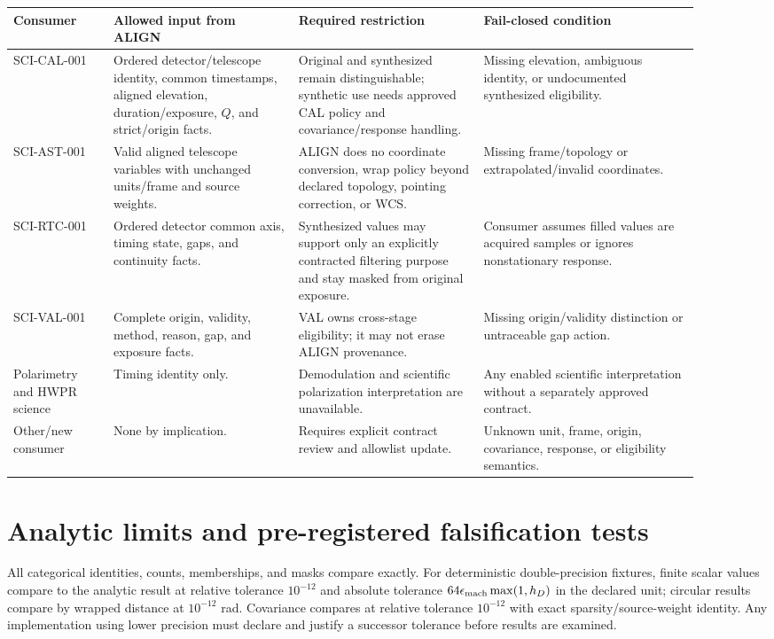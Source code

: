 \documentclass[11pt]{article}
\begin{document}
\begin{longtable}{L{0.13\linewidth}L{0.24\linewidth}L{0.24\linewidth}L{0.29\linewidth}}
\toprule
Consumer & Allowed input from ALIGN & Required restriction & Fail-closed condition\\
\midrule
SCI-CAL-001 & Ordered detector/telescope identity, common timestamps, aligned elevation, duration/exposure, \(Q\), and strict/origin facts. & Original and synthesized remain distinguishable; synthetic use needs approved CAL policy and covariance/response handling. & Missing elevation, ambiguous identity, or undocumented synthesized eligibility.\\
SCI-AST-001 & Valid aligned telescope variables with unchanged units/frame and source weights. & ALIGN does no coordinate conversion, wrap policy beyond declared topology, pointing correction, or WCS. & Missing frame/topology or extrapolated/invalid coordinates.\\
SCI-RTC-001 & Ordered detector common axis, timing state, gaps, and continuity facts. & Synthesized values may support only an explicitly contracted filtering purpose and stay masked from original exposure. & Consumer assumes filled values are acquired samples or ignores nonstationary response.\\
SCI-VAL-001 & Complete origin, validity, method, reason, gap, and exposure facts. & VAL owns cross-stage eligibility; it may not erase ALIGN provenance. & Missing origin/validity distinction or untraceable gap action.\\
Polarimetry and HWPR science & Timing identity only. & Demodulation and scientific polarization interpretation are unavailable. & Any enabled scientific interpretation without a separately approved contract.\\
Other/new consumer & None by implication. & Requires explicit contract review and allowlist update. & Unknown unit, frame, origin, covariance, response, or eligibility semantics.\\
\bottomrule
\end{longtable}

\section{Analytic limits and pre-registered falsification tests}

All categorical identities, counts, memberships, and masks compare exactly.
For deterministic double-precision fixtures, finite scalar values compare to
the analytic result at relative tolerance \(10^{-12}\) and absolute tolerance
\(64\epsilon_{\rm mach}\max(1,h_D)\) in the declared unit; circular results
compare by wrapped distance at \(10^{-12}\) rad.  Covariance compares at
relative tolerance \(10^{-12}\) with exact sparsity/source-weight identity.
Any implementation using lower precision must declare and justify a
successor tolerance before results are examined.
\end{document}
